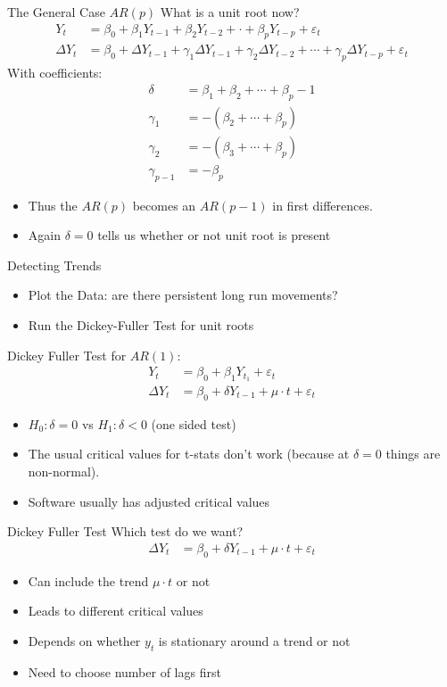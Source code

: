 \documentclass[aspectratio=169]{beamer}
\begin{document}
\begin{frame}{The General Case $AR(p)$}
What is a unit root now?
\begin{align*}
Y_t &= \beta_0 + \beta_1 Y_{t-1} + \beta_2 Y_{t-2} + \cdot + \beta_p Y_{t-p} + \varepsilon_t\\
\Delta Y_t &= \beta_0 + \Delta Y_{t-1} + \gamma_1 \Delta Y_{t-1} + \gamma_2 \Delta Y_{t-2} +  \cdots +  \gamma_p \Delta Y_{t-p}  + \varepsilon_t
\end{align*}
With coefficients:
\begin{align*}
\delta &= \beta_1 + \beta_2 + \cdots + \beta_p -1\\
\gamma_1 &=  -(\beta_2 + \cdots + \beta_p)\\
\gamma_2 &=  -(\beta_3 + \cdots + \beta_p)\\
\gamma_{p-1} &=  -\beta_p
\end{align*}
\begin{itemize}
    \item Thus the $AR(p)$ becomes an $AR(p-1)$ in first differences.
    \item Again $\delta=0$ tells us whether or not unit root is present
\end{itemize}
\end{frame}

\begin{frame}{Detecting Trends}
\begin{itemize}
\item Plot the Data: are there persistent long run movements?
\item Run the Dickey-Fuller Test for unit roots
\end{itemize}
Dickey Fuller Test for $AR(1)$:
\begin{align*}
Y_t &= \beta_0 + \beta_1 Y_{t_1} +\varepsilon_t\\
\Delta Y_t &= \beta_0 + \delta Y_{t-1} + \mu \cdot t + \varepsilon_t
\end{align*}
\begin{itemize}
\item $H_0: \delta = 0$ vs $H_1: \delta < 0$ (one sided test)
\item The usual critical values for t-stats don't work (because at $\delta=0$ things are non-normal).
\item Software usually has adjusted critical values
\end{itemize}
\end{frame}


\begin{frame}{Dickey Fuller Test}
Which test do we want?
\begin{align*}
\Delta Y_t &= \beta_0 + \delta Y_{t-1} + \mu \cdot t + \varepsilon_t
\end{align*}
\begin{itemize}
\item Can include the trend $\mu \cdot t$ or not
\item Leads to different critical values
\item Depends on whether $y_t$ is stationary around a trend or not
\item Need to choose number of lags first
\end{itemize}
\end{frame}
\end{document}
